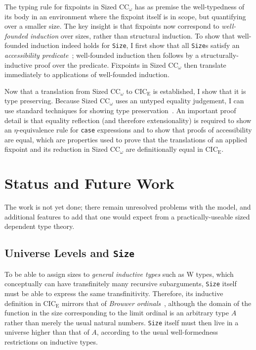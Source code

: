 \documentclass[acmsmall,nonacm, screen]{acmart}
\newcommand{\lang}{Sized CC$_\omega$\xspace}
\newcommand{\CICE}{CIC$_\mathrm{E}$\xspace}
\newcommand{\we}{I\xspace}
\begin{document}
The typing rule for fixpoints in \lang has as premise the well-typedness of its body
in an environment where the fixpoint itself is in scope, but quantifying over a smaller size.
The key insight is that fixpoints now correspond to \emph{well-founded induction} over sizes,
rather than structural induction.
To show that well-founded induction indeed holds for \texttt{Size},
\we first show that all \texttt{Size}s satisfy an \emph{accessibility predicate}~\citep{wfind};
well-founded induction then follows by a structurally-inductive proof over the predicate.
Fixpoints in \lang then translate immediately to applications of well-founded induction.

Now that a translation from \lang to \CICE is established, \we show that it is type preserving.
Because \lang uses an untyped equality judgement, \we can use standard techniques for showing type preservation~\citep{compiling}.
An important proof detail is that equality reflection (and therefore extensionality) is required
to show an $\eta$-equivalence rule for \texttt{case} expressions
and to show that proofs of accessibility are equal,
which are properties used to prove that the translations of an applied fixpoint and its reduction in \lang
are definitionally equal in \CICE.

\section{Status and Future Work}

The work is not yet done;
there remain unresolved problems with the model,
and additional features to add that one would expect
from a practically-useable sized dependent type theory.

\subsection{Universe Levels and \texttt{Size}}

To be able to assign sizes to \emph{general inductive types} such as W types,
which conceptually can have transfinitely many recursive subarguments,
\texttt{Size} itself must be able to express the same transfinitivity.
Therefore, its inductive definition in \CICE mirrors that of \emph{Brouwer ordinals}~\citep{ordinals},
although the domain of the function in the size corresponding to the limit ordinal is an arbitrary type $A$
rather than merely the usual natural numbers.
\texttt{Size} itself must then live in a universe higher than that of $A$,
according to the usual well-formedness restrictions on inductive types.
\end{document}
